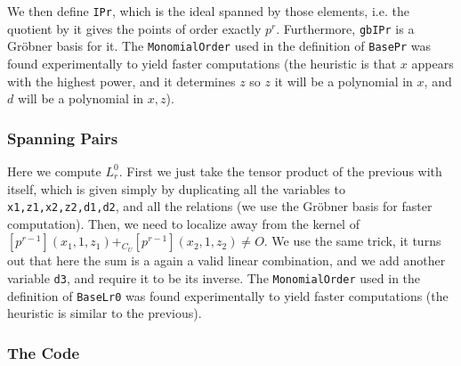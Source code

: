 We then define \texttt{IPr}, which is the ideal spanned by those elements, i.e. the quotient by it gives the points of order exactly $p^r$.
Furthermore, \texttt{gbIPr} is a Gr\"{o}bner basis for it.
The \texttt{MonomialOrder} used in the definition of \texttt{BasePr} was found experimentally to yield faster computations (the heuristic is that $x$ appears with the highest power, and it determines $z$ so $z$ it will be a polynomial in $x$, and $d$ will be a polynomial in $x,z$).

\subsubsection{Spanning Pairs}

Here we compute $L_r^0$.
First we just take the tensor product of the previous with itself, which is given simply by duplicating all the variables to \texttt{x1,z1,x2,z2,d1,d2}, and all the relations (we use the Gr\"{o}bner basis for faster computation).
Then, we need to localize away from the kernel of $\left[p^{r-1}\right]\left(x_1,1,z_1\right) +_{C_U} \left[p^{r-1}\right]\left(x_2,1,z_2\right) \neq O$.
We use the same trick, it turns out that here the sum is a again a valid linear combination, and we add another variable \texttt{d3}, and require it to be its inverse.
The \texttt{MonomialOrder} used in the definition of \texttt{BaseLr0} was found experimentally to yield faster computations (the heuristic is similar to the previous).

\subsubsection{The Code}

